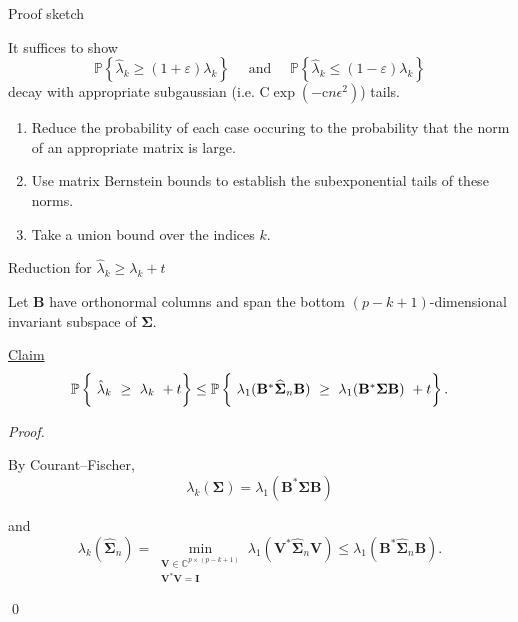 \documentclass[xcolor={svgnames,pdftex,dvipsnames,table},10pt]{beamer} %
\newcommand{\mat}[1]{\ensuremath{\mathbf{#1}}}
\newcommand{\Prob}[1]{\ensuremath{\mathbb{P}\left\{#1 \right\}}}
\renewcommand{\star}{*}
\newcommand{\C}{\ensuremath{\mathbb{C}}}
\begin{document}
\begin{frame}{Proof sketch}

It suffices to show
\[
 \textstyle \Prob{\hat{\lambda}_k \geq (1+\varepsilon) \lambda_k } \quad \text{ and } \quad \Prob{\hat{\lambda}_k \leq (1-\varepsilon) \lambda_k}
\]
decay with appropriate subgaussian (i.e. $\mathrm{C} \exp(-\mathrm{c} n \epsilon^2)$) tails.

\pause
\begin{enumerate}
		
	\item Reduce the probability of each case occuring to the probability that the norm of an appropriate matrix is large.

	\pause
	
	\item Use matrix Bernstein bounds to establish the subexponential tails of these norms. 

	\pause
	
	\item Take a union bound over the indices $k.$
 \end{enumerate}
 
\end{frame}

\begin{frame}{Reduction for $\hat{\lambda}_k \geq \lambda_k + t$}

Let $\mat{B}$ have orthonormal columns and span the bottom $(p-k+1)$-dimensional invariant subspace of $\mat{\Sigma}.$

\underline{Claim}
\[
\Prob{
\begin{tikzpicture}[baseline]
\node[anchor=base] (esteigenval) {$\hat{\lambda}_k$};
\end{tikzpicture}
\geq 
\tikz[baseline]{\node[anchor=base] (eigenval) {$\lambda_k$};} + t 
} \leq
\Prob{
\tikz[baseline]{\node[anchor=base] (pinchedesteigenval) {$\lambda_1(\mat{B}^\star \widehat{\mat{\Sigma}}_n \mat{B})$}; }
\geq  
\tikz[baseline]{\node[anchor=base] (eigenvalexpansion) {$\lambda_1(\mat{B}^\star \mat{\Sigma} \mat{B})$};} + t }.
\]

\pause
\emph{Proof.}

By Courant--Fischer,
\[
 \lambda_k(\mat{\Sigma}) = \lambda_1(\mat{B}^\star \mat{\Sigma} \mat{B})
\]

\pause
and
\[
\lambda_k(\widehat{\mat{\Sigma}}_n) = \min_{\substack{ \mat{V} \in \C^{p \times (p-k+1)} \\ \mat{V}^\star\mat{V}=\mat{I}}} \lambda_1(\mat{V}^\star \widehat{\mat{\Sigma}}_n\mat{V}) \leq \lambda_1(\mat{B}^\star \widehat{\mat{\Sigma}}_n \mat{B}).
\]

\qed
\end{frame}
\end{document}
